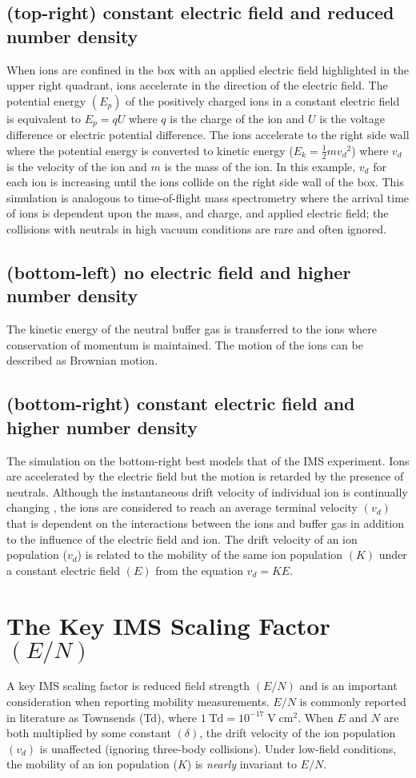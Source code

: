 \documentclass[10pt,a4paper,final]{article}
\begin{document}
\subsection{(top-right) constant electric field and reduced number density}
When ions are confined in the box with an applied electric field highlighted in the upper right quadrant, ions accelerate in the direction of the electric field. The potential energy $(E_{p})$ of the positively charged ions in a constant electric field is equivalent to $E_{p}=qU$ where $q$ is the charge of the ion and $U$ is the voltage difference or electric potential difference. The ions accelerate to the right side wall where the potential energy is converted to kinetic energy ($E_k=\frac{1}{2}m{v_d}^2$) where $v_d$ is the velocity of the ion and $m$ is the mass of the ion. In this example, $v_d$ for each ion is increasing until the ions collide on the right side wall of the box. This simulation is analogous to time-of-flight mass spectrometry where the arrival time of ions is dependent upon the mass, and charge, and applied electric field; the collisions with neutrals in high vacuum conditions are rare and often ignored.


\subsection{(bottom-left) no electric field and higher number density}
The kinetic energy of the neutral buffer gas is transferred to the ions where conservation of momentum is maintained. The motion of the ions can be described as Brownian motion.

\subsection{(bottom-right) constant electric field and higher number density}
The simulation on the bottom-right best models that of the IMS experiment. Ions are accelerated by the electric field but the motion is retarded by the presence of neutrals.  Although the instantaneous drift velocity of individual ion is continually changing , the ions are considered to reach an average terminal velocity $(v_d)$ that is dependent on the interactions between the ions and buffer gas in addition to the influence of the electric field and ion. The drift velocity of an ion population ($v_d$) is related to the mobility of the same ion population $(K)$ under a constant electric field $(E)$ from the equation $v_d=KE$.


\section{The Key IMS Scaling Factor $(E/N)$}
A key IMS scaling factor is reduced field strength $(E/N)$ and is an important consideration when reporting mobility measurements. $E/N$ is commonly reported in literature as Townsends (Td), where $1 \;\text{Td} = 10^{-17}\;\text{V}\; \text{cm}^2$.
When $E$ and $N$ are both multiplied by some constant $(\delta)$, the drift velocity of the ion population $(v_d)$ is unaffected (ignoring three-body collisions). Under low-field conditions, the mobility of an ion population ($K$) is \textit{nearly} invariant to $E/N$.
\end{document}
